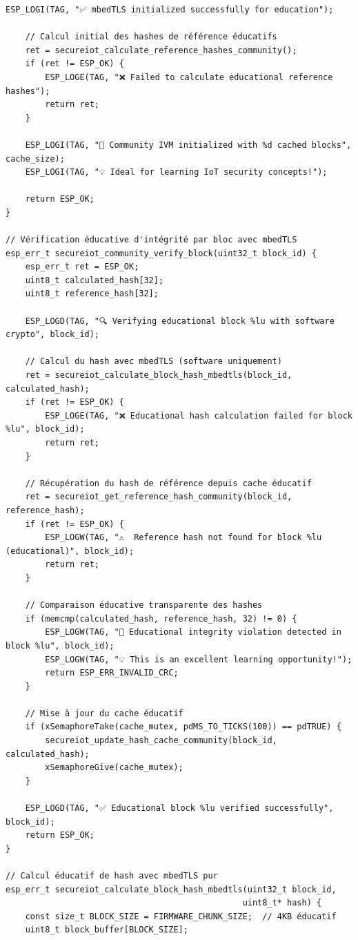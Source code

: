 \begin{lstlisting}[caption={Implémentation IVM Community utilisant mbedTLS}]
    ESP_LOGI(TAG, "✅ mbedTLS initialized successfully for education");
    
    // Calcul initial des hashes de référence éducatifs
    ret = secureiot_calculate_reference_hashes_community();
    if (ret != ESP_OK) {
        ESP_LOGE(TAG, "❌ Failed to calculate educational reference hashes");
        return ret;
    }
    
    ESP_LOGI(TAG, "🎉 Community IVM initialized with %d cached blocks", cache_size);
    ESP_LOGI(TAG, "💡 Ideal for learning IoT security concepts!");
    
    return ESP_OK;
}

// Vérification éducative d'intégrité par bloc avec mbedTLS
esp_err_t secureiot_community_verify_block(uint32_t block_id) {
    esp_err_t ret = ESP_OK;
    uint8_t calculated_hash[32];
    uint8_t reference_hash[32];
    
    ESP_LOGD(TAG, "🔍 Verifying educational block %lu with software crypto", block_id);
    
    // Calcul du hash avec mbedTLS (software uniquement)
    ret = secureiot_calculate_block_hash_mbedtls(block_id, calculated_hash);
    if (ret != ESP_OK) {
        ESP_LOGE(TAG, "❌ Educational hash calculation failed for block %lu", block_id);
        return ret;
    }
    
    // Récupération du hash de référence depuis cache éducatif
    ret = secureiot_get_reference_hash_community(block_id, reference_hash);
    if (ret != ESP_OK) {
        ESP_LOGW(TAG, "⚠️  Reference hash not found for block %lu (educational)", block_id);
        return ret;
    }
    
    // Comparaison éducative transparente des hashes
    if (memcmp(calculated_hash, reference_hash, 32) != 0) {
        ESP_LOGW(TAG, "🚨 Educational integrity violation detected in block %lu", block_id);
        ESP_LOGW(TAG, "💡 This is an excellent learning opportunity!");
        return ESP_ERR_INVALID_CRC;
    }
    
    // Mise à jour du cache éducatif
    if (xSemaphoreTake(cache_mutex, pdMS_TO_TICKS(100)) == pdTRUE) {
        secureiot_update_hash_cache_community(block_id, calculated_hash);
        xSemaphoreGive(cache_mutex);
    }
    
    ESP_LOGD(TAG, "✅ Educational block %lu verified successfully", block_id);
    return ESP_OK;
}

// Calcul éducatif de hash avec mbedTLS pur
esp_err_t secureiot_calculate_block_hash_mbedtls(uint32_t block_id, 
                                                uint8_t* hash) {
    const size_t BLOCK_SIZE = FIRMWARE_CHUNK_SIZE;  // 4KB éducatif
    uint8_t block_buffer[BLOCK_SIZE];
    

\end{lstlisting}
